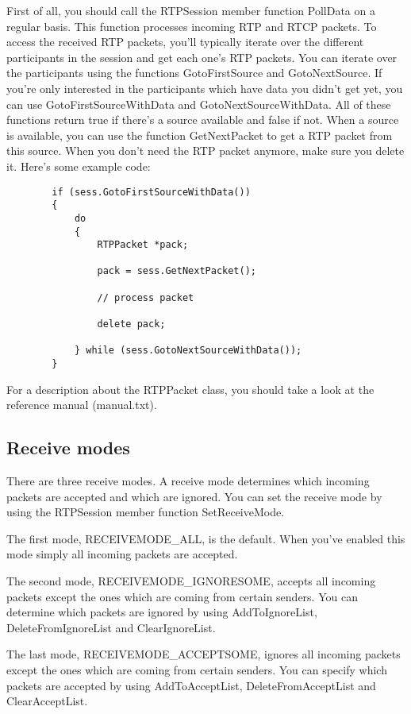 First of all, you should call the RTPSession member function PollData on a
regular basis. This function processes incoming RTP and RTCP packets. To
access the received RTP packets, you'll typically iterate over the different
participants in the session and get each one's RTP packets. You can iterate
over the participants using the functions GotoFirstSource and GotoNextSource.
If you're only interested in the participants which have data you didn't get
yet, you can use GotoFirstSourceWithData and GotoNextSourceWithData. All of
these functions return true if there's a source available and false if not.
When a source is available, you can use the function GetNextPacket to get a
RTP packet from this source. When you don't need the RTP packet anymore, make
sure you delete it. Here's some example code:
        \begin{verbatim}
        if (sess.GotoFirstSourceWithData())
        {
            do
            {
                RTPPacket *pack;
                
                pack = sess.GetNextPacket();
                
                // process packet
                
                delete pack;
                
            } while (sess.GotoNextSourceWithData());
        }
        \end{verbatim}

For a description about the RTPPacket class, you should take a look at the
reference manual (manual.txt).

\subsection{Receive modes}

There are three receive modes. A receive mode determines which incoming
packets are accepted and which are ignored. You can set the receive mode by
using the RTPSession member function SetReceiveMode.
    
    
    The first mode, RECEIVEMODE\_ALL, is the default. When you've enabled
this mode simply all incoming packets are accepted.
    
    
    The second mode, RECEIVEMODE\_IGNORESOME, accepts all incoming packets
except the ones which are coming from certain senders. You can determine which
packets are ignored by using AddToIgnoreList, DeleteFromIgnoreList and
ClearIgnoreList.
    
    
    The last mode, RECEIVEMODE\_ACCEPTSOME, ignores all incoming packets
except the ones which are coming from certain senders. You can specify which
packets are accepted by using AddToAcceptList, DeleteFromAcceptList and
ClearAcceptList.


